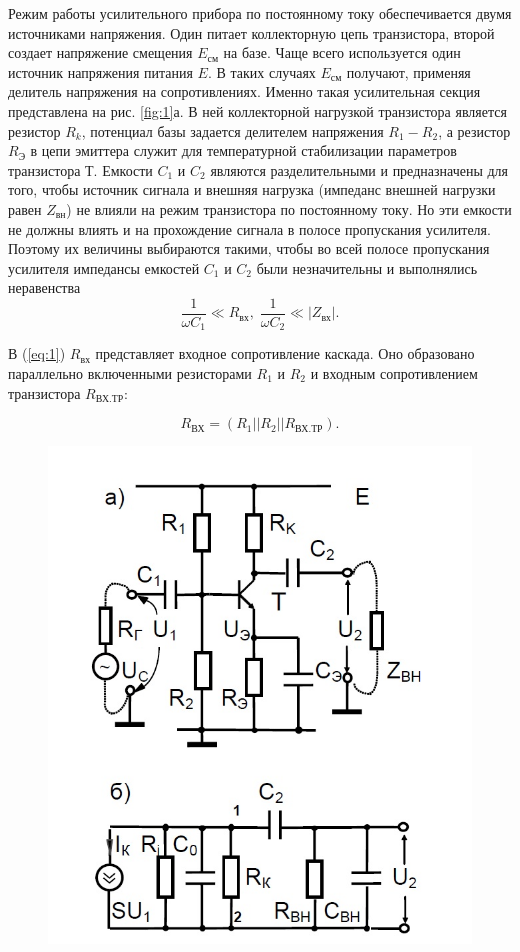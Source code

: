 Режим работы усилительного прибора по постоянному току обеспечивается двумя источниками напряжения. Один питает коллекторную цепь транзистора, второй создает
напряжение смещения $E_{\text{см}}$ на базе. Чаще всего используется один источник напряжения питания $E$. В таких случаях $E_{\text{см}}$ получают, применяя делитель напряжения на сопротивлениях. Именно такая усилительная секция представлена на рис. \ref{fig:1}а. В ней коллекторной нагрузкой транзистора является резистор $R_k$, потенциал базы
задается делителем напряжения $R_1-R_2$, а резистор $R_{\text{Э}}$ в цепи эмиттера служит для температурной стабилизации параметров транзистора Т. Емкости $C_1$ и $C_2$ являются разделительными и предназначены для того, чтобы источник сигнала и внешняя нагрузка (импеданс внешней нагрузки равен $Z_{\text{вн}}$) не влияли на режим транзистора по постоянному току. Но эти емкости не должны влиять и на прохождение сигнала в полосе пропускания усилителя. Поэтому их величины выбираются такими, чтобы во всей полосе пропускания усилителя импедансы емкостей $C_1$ и $C_2$ были незначительны и выполнялись неравенства
\begin{equation}
	\frac{1}{\omega C_1}\ll R_{\text{вх}},\; \frac{1}{\omega C_2}\ll |Z_{\text{вх}}|.
	\label{eq:1}
\end{equation}

В (\ref{eq:1}) $R_{\text{вх}}$ представляет входное сопротивление каскада. Оно образовано параллельно включенными резисторами $R_1$ и $R_2$ и входным  сопротивлением транзистора $R_{\text{ВХ.ТР}}$:

$$R_{\text{ВХ}}=(R_1||R_2||R_{\text{ВХ.ТР}}).$$
	
\begin{figure}[ht]
	\centering
	\includegraphics[width=0.6\linewidth]{fig/fig4}
	\caption{}
	\label{fig:4}
\end{figure}

